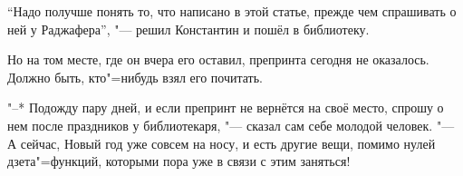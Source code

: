 \enquote{Надо получше понять то, что написано в этой статье, прежде чем
спрашивать о ней у Раджафера}, "--- решил Константин и пошёл в библиотеку.

Но на том месте, где он вчера его оставил, препринта сегодня не оказалось.
Должно быть, кто"=нибудь взял его почитать.

"--* Подожду пару дней, и если препринт не вернётся на своё место, спрошу о нем
после праздников у библиотекаря, "--- сказал сам себе молодой человек.
"--- А сейчас, Новый год уже совсем на носу, и есть другие вещи, помимо нулей
дзета"=функций, которыми пора уже в связи с этим заняться!
